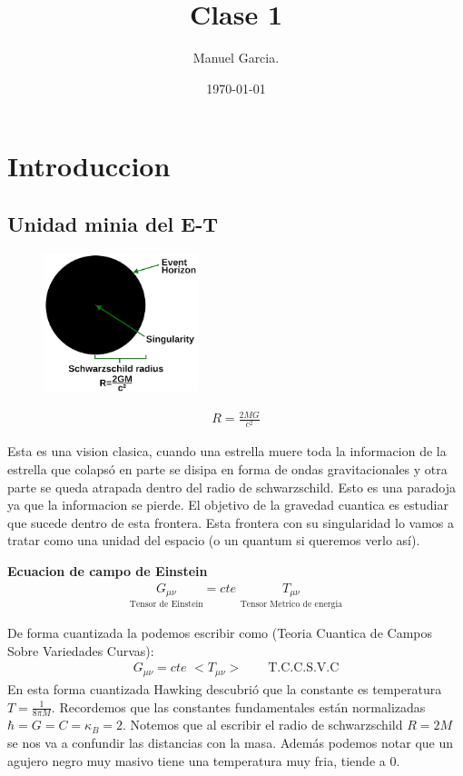 \documentclass{article}
\title{Clase 1 }
\author{Manuel Garcia.}
\date{\today}
\begin{document}
\maketitle

\section{Introduccion }
\subsection{Unidad minia del E-T }
\begin{figure}[H]
  \begin{center}
    \includegraphics[width=0.4\textwidth]{radio_swa.png}
  \end{center}
\end{figure}
\begin{gather*}
  R = \frac{2MG }{c^2} 
\end{gather*}

Esta es una vision clasica, cuando una estrella muere toda la informacion de la estrella que colapsó en parte se disipa en forma de ondas gravitacionales y otra parte se queda atrapada dentro del radio de schwarzschild. Esto es una paradoja ya que la informacion se pierde. El objetivo de la gravedad cuantica es estudiar que sucede dentro de esta frontera. Esta frontera con su singularidad lo vamos a tratar como una unidad del espacio (o un quantum si queremos verlo así).

\textbf{Ecuacion de campo de Einstein}
\begin{gather*}
  \underset{\text{Tensor de Einstein}}{G _{\mu\nu}} = \textit{cte } \underset{\text{Tensor Metrico de energia}}{T _{\mu\nu}  }
\end{gather*}

De forma cuantizada la podemos escribir como (Teoria Cuantica de Campos Sobre Variedades Curvas): 
\begin{gather*}
  G _{\mu\nu}  = \textit{cte } < T _{\mu\nu}  > \qquad \text{T.C.C.S.V.C} 
\end{gather*}
En esta forma cuantizada Hawking descubrió que la constante es temperatura $ T = \displaystyle\frac{1 }{8\pi M} $. Recordemos que las constantes fundamentales están normalizadas $ \hbar = G=C=\kappa_B=2  $. Notemos que al escribir el radio de schwarzschild $ R=2M  $ se nos va a confundir las distancias con la masa. Además podemos notar que un agujero negro muy masivo tiene una temperatura muy fria, tiende a 0.
\end{document}

